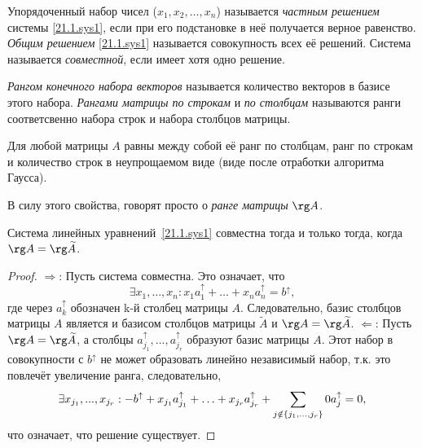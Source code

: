 \begin{defn}
Упорядоченный набор чисел ($x_1, x_2, \ldots, x_n$) называется \textit{частным решением} системы \eqref{21.1.sys1}, если при его подстановке в неё получается верное равенство. \textit{Общим решением} \eqref{21.1.sys1} называется совокупность всех её решений. Система называется \textit{совместной}, если имеет хотя одно решение.
\end{defn}
\begin{defn}
\textit{Рангом конечного набора векторов} называется количество векторов в базисе этого набора. \textit{Рангами матрицы по строкам} и \textit{по столбцам} называются ранги соответсвенно набора строк и набора столбцов матрицы.
\end{defn}
\begin{lemm} 
Для любой матрицы $A$ равны между собой её ранг по столбцам, ранг по строкам и количество строк в неупрощаемом виде (виде после отработки алгоритма Гаусса).
\end{lemm}
В силу этого свойства, говорят просто о \textit{ранге матрицы} $\rg A$.
\begin{thm}
Система линейных уравнений~\eqref{21.1.sys1} совместна тогда и только тогда, когда $\rg A = \rg \widetilde A$.
\end{thm}
\begin{proof}
$\Rightarrow$: Пусть система совместна. Это означает, что
\begin{equation*}
\exists x_1,\ldots, x_n: x_1a_1^\uparrow +\ldots+x_na_n^\uparrow=b^\uparrow,
\end{equation*}
где через $a_k^\uparrow$ обозначен k-й столбец матрицы $A$. Следовательно, базис столбцов матрицы $A$  является и базисом столбцов матрицы $\widetilde A$ и $\rg A = \rg \widetilde A$.
$\Leftarrow$: Пусть $\rg A = \rg \widetilde A$, а столбцы $a_{j_1}^\uparrow,...,a_{j_r}^\uparrow$ образуют базис матрицы $A$. Этот набор в совокупности с $b^\uparrow$ не может образовать линейно независимый набор, т.к. это повлечёт увеличение ранга, следовательно, 
\begin{equation*}\\ 
\exists x_{j_1},...,x_{j_r}: -b^\uparrow+x_{j_1}a_{j_1}^\uparrow+\ldots+x_{j_r}a_{j_r}^\uparrow+\sum_{j \notin \{j_1,...,j_r\}}0 a_j^\uparrow = 0,
\end{equation*} 
что означает, что решение существует.
\end{proof}

